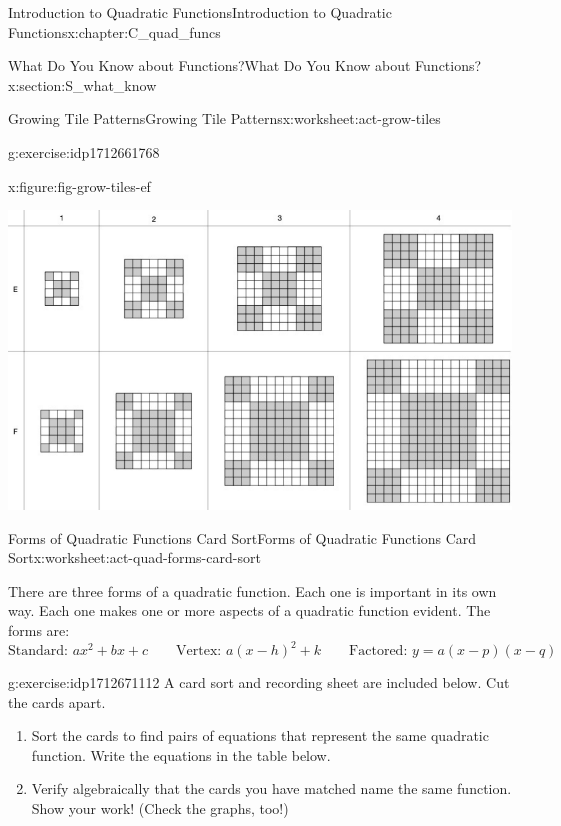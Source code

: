 \documentclass[oneside,10pt,]{book}
\numberwithin{equation}{chapter}
\begin{document}
\begin{chapterptx}{Introduction to Quadratic Functions}{}{Introduction to Quadratic Functions}{}{}{x:chapter:C_quad_funcs}
\begin{sectionptx}{What Do You Know about Functions?}{}{What Do You Know about Functions?}{}{}{x:section:S_what_know}
\begin{worksheet-subsection}{Growing Tile Patterns}{}{Growing Tile Patterns}{}{}{x:worksheet:act-grow-tiles}
\begin{divisionexercise}{8}{}{}{g:exercise:idp1712661768}
\begin{figureptx}{}{x:figure:fig-grow-tiles-ef}{}
\begin{image}{0.05}{0.9}{0.05}
\includegraphics[width=\linewidth]{external/grow-tiles-ef.pdf}
\end{image}%
\tcblower
\end{figureptx}%
\end{divisionexercise}%
\end{worksheet-subsection}
\restoregeometry
%
%
\typeout{************************************************}
\typeout{************************************************}
%
\begin{worksheet-subsection}{Forms of Quadratic Functions Card Sort}{}{Forms of Quadratic Functions Card Sort}{}{}{x:worksheet:act-quad-forms-card-sort}
\begin{introduction}{}%
There are three forms of a quadratic function. Each one is important in its own way. Each one makes one or more aspects of a quadratic function evident. The forms are:%
\begin{equation*}
\text{Standard: } ax^2 + bx + c \qquad \text{Vertex: } a(x - h)^2 + k \qquad \text{Factored: } y = a(x - p)(x - q)
\end{equation*}
%
\end{introduction}%
\begin{divisionexercise}{1}{}{}{g:exercise:idp1712671112}%
A card sort and recording sheet are included below. Cut the cards apart.%
\begin{enumerate}[font=\bfseries,label=(\alph*),ref=\alph*]
\item{}Sort the cards to find pairs of equations that represent the same quadratic function. Write the equations in the table below.%
\item{}Verify algebraically that the cards you have matched name the same function. Show your work! (Check the graphs, too!)%

\end{enumerate}
\end{divisionexercise}
\end{worksheet-subsection}
\end{sectionptx}
\end{chapterptx}
\end{document}
